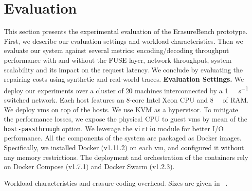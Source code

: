 \vspace{-1mm}
\section{Evaluation}
\label{sec:evaluation}
This section presents the experimental evaluation of the ErasureBench prototype. 
First, we describe our evaluation settings and workload characteristics.  %
Then we evaluate our system against several metrics: encoding/decoding throughput performance with and without the FUSE layer, network throughput, system scalability and its impact on the request latency.
We conclude by evaluating the repairing costs using synthetic and real-world traces.
\textbf{Evaluation Settings.}
We deploy our experiments over a cluster of \num{20} machines interconnected by a \SI{1}{\giga\bit\per\second} switched network.
Each host features an 8-core Intel Xeon CPU and \SI{8}{\giga\byte} of RAM.
We deploy \acp{vm} on top of the hosts.
We use KVM as a hypervisor.
To mitigate the performance losses, we expose the physical CPU to guest \acp{vm} by mean of the \texttt{host-passthrough} option.
We leverage the \texttt{virtio} module for better I/O performance.
All the components of the system are packaged as Docker images.
Specifically, we installed Docker (v1.11.2) on each \ac{vm}, and configured it without any memory restrictions.
The deployment and orchestration of the containers rely on Docker Compose (v1.7.1) and Docker Swarm (v1.2.3).

\begin{table}[t]
    \centering
    \caption{Workload characteristics and erasure-coding overhead. Sizes are given in \si{\mega\byte}.}
    
    \label{fig:overhead-table}
\end{table}

